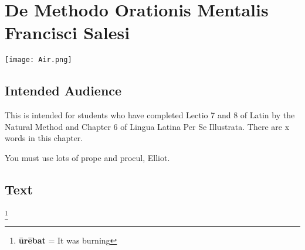 \chapter{De Methodo Orationis Mentalis Francisci Salesi}
\begin{center}
\texttt{[image: Air.png]}
\end{center}

\section{Intended Audience}
This is intended for students who have completed Lectio 7 and 8 of Latin by the Natural Method and Chapter 6 of Lingua Latina Per Se Illustrata. There are x words in this chapter.

You must use lots of prope and procul, Elliot.

\section{Text}



\footnote{\textbf{ūrēbat} = It was burning}